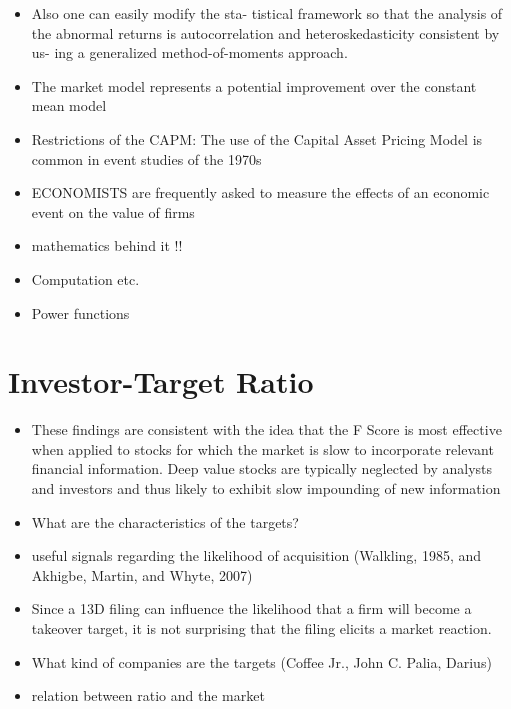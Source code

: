 \documentclass[12pt]{article}
\begin{document}
\begin{itemize}
        \item Also one can easily modify the sta- tistical framework so that the analysis of the abnormal returns is autocorrelation and heteroskedasticity consistent by us- ing a generalized method-of-moments approach.\citep{MacKinlay1997}
        \item The market model represents a potential improvement over the constant mean model \citep{MacKinlay1997}
        \item Restrictions of the CAPM: The use of the Capital Asset Pricing Model is common in event studies of the 1970s \citep{MacKinlay1997} 
        \item ECONOMISTS are frequently asked to measure the effects of an economic event on the value of firms \citep{MacKinlay1997}
        \item mathematics behind it !! 
        \item Computation etc.
        \item Power functions 
    \end{itemize}

\section{Investor-Target Ratio} 

    \begin{itemize}
        \item These findings are consistent with the idea that the F Score is most effective when applied to stocks for which the market is slow to incorporate relevant financial information. Deep value stocks are typically neglected by analysts and investors and thus likely to exhibit slow impounding of new information \citep{Hyde2014}
        \item What are the characteristics of the targets?
        \item useful signals regarding the likelihood of acquisition
        (Walkling, 1985, and Akhigbe, Martin, and Whyte, 2007) \citep{Brigida2012}
        \item Since a 13D filing can influence the likelihood that a firm will become a takeover target, it is not surprising that the filing elicits a market reaction.\citep{Brigida2012}
        \item What kind of companies are the targets (Coffee Jr., John C.
        Palia, Darius)
        \item relation between ratio and the market 
    \end{itemize}
\end{document}
